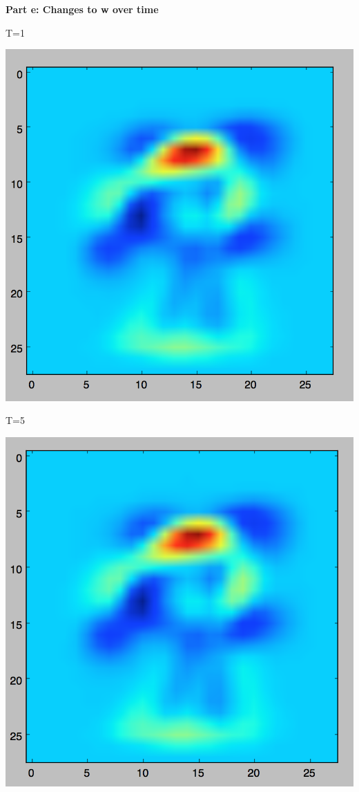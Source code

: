 \documentclass[twoside,11pt]{homework}
\begin{document}
\textbf{Part e: Changes to w over time}

T=1

\includegraphics[scale=.5]{images/w1.png}

T=5

\includegraphics[scale=.5]{images/w5.png}
\end{document}
